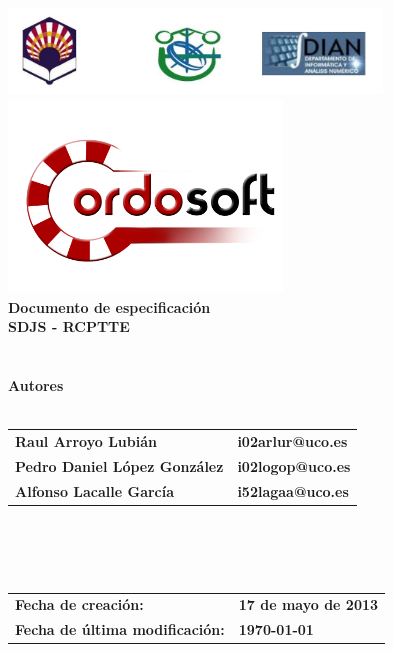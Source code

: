 \documentclass[a4paper,11pt]{article}
\begin{document}
	\begin{titlepage}
		\begin{center}
			\includegraphics[width=375px]{Universidad.png} \\
            \includegraphics[width=275px]{logo_cordosoft.png} \\
			\textbf{\LARGE Documento de especificación} \\
			\textbf{\Large SDJS - RCPTTE} \\
			\\
			\textbf{}
			\\
			\textbf{Autores}
			\\
			\textbf{}
			\\
			\begin{tabular}{l l}
				\textbf{Raul Arroyo Lubián} & \textbf{i02arlur@uco.es} \\	
				\textbf{Pedro Daniel López González} & \textbf{i02logop@uco.es} \\
				\textbf{Alfonso Lacalle García} & \textbf{i52lagaa@uco.es} \\
			\end{tabular}
			\\
			\textbf{}
			\\
			\textbf{}
			\\
			\begin{tabular}{l l}
				\textbf{Fecha de creación:} & \textbf{17 de mayo de 2013} \\
				\textbf{Fecha de última modificación:} & \textbf{\today } \\
			\end{tabular}
		\end{center}
    \end{titlepage}
	\newpage
	\tableofcontents
	\newpage
\end{document}
